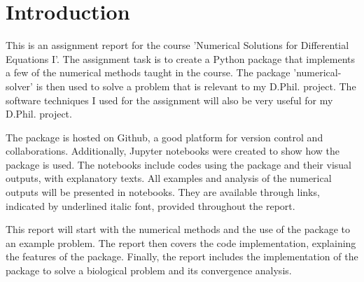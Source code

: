\chapter{Introduction}
\label{chap:introduction}
This is an assignment report for the course 'Numerical Solutions for Differential Equations \RN{1}'. The assignment task is to create a Python package that implements a few of the numerical methods taught in the course. The package 'numerical-solver' is then used to solve a problem that is relevant to my D.Phil. project. The software techniques I used for the assignment will also be very useful for my D.Phil. project.

The package is hosted on Github, a good platform for version control and collaborations. Additionally, Jupyter notebooks were created to show how the package is used. The notebooks include codes using the package and their visual outputs, with explanatory texts. All examples and analysis of the numerical outputs will be presented in notebooks. They are available through links, indicated by underlined italic font, provided throughout the report. 

This report will start with the numerical methods and the use of the package to an example problem. The report then covers the code implementation, explaining the features of the package. Finally, the report includes the implementation of the package to solve a biological problem and its convergence analysis. 
